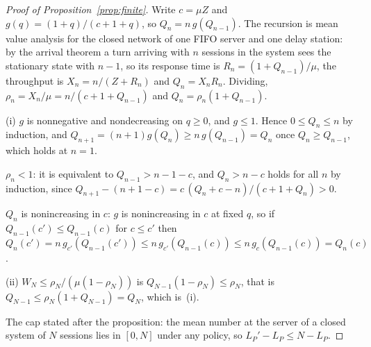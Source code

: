 \documentclass{article}
\theoremstyle{plain}
\theoremstyle{definition}
\theoremstyle{remark}
\begin{document}
\begin{proof}[Proof of Proposition~\ref{prop:finite}]
Write $c=\mu Z$ and $g(q)=(1+q)/(c+1+q)$, so $Q_n=n\,g(Q_{n-1})$. The
recursion is mean value analysis for the closed network of one FIFO
server and one delay station: by the arrival theorem a turn arriving
with $n$ sessions in the system sees the stationary state with $n-1$,
so its response time is $R_n=(1+Q_{n-1})/\mu$, the throughput is
$X_n=n/(Z+R_n)$ and $Q_n=X_nR_n$. Dividing, $\rho_n=X_n/\mu=
n/(c+1+Q_{n-1})$ and $Q_n=\rho_n(1+Q_{n-1})$.

(i) $g$ is nonnegative and nondecreasing on $q\ge0$, and
$g\le1$. Hence $0\le Q_n\le n$ by induction, and
$Q_{n+1}=(n+1)g(Q_n)\ge n\,g(Q_{n-1})=Q_n$ once $Q_n\ge Q_{n-1}$,
which holds at $n=1$.

$\rho_n<1$: it is equivalent to $Q_{n-1}>n-1-c$, and $Q_n>n-c$ holds
for all $n$ by induction, since
$Q_{n+1}-(n+1-c)=c\,(Q_n+c-n)/(c+1+Q_n)>0$.

$Q_n$ is nonincreasing in $c$: $g$ is nonincreasing in $c$ at fixed
$q$, so if $Q_{n-1}(c')\le Q_{n-1}(c)$ for $c\le c'$ then
$Q_n(c')=n\,g_{c'}(Q_{n-1}(c'))\le n\,g_{c'}(Q_{n-1}(c))\le
n\,g_c(Q_{n-1}(c))=Q_n(c)$.

(ii) $W_N\le\rho_N/(\mu(1-\rho_N))$ is $Q_{N-1}(1-\rho_N)\le\rho_N$,
that is $Q_{N-1}\le\rho_N(1+Q_{N-1})=Q_N$, which is~(i).

The cap stated after the proposition: the mean number at the server of
a closed system of $N$ sessions lies in $[0,N]$ under any policy, so
$L_P'-L_P\le N-L_P$.
\end{proof}
\end{document}
